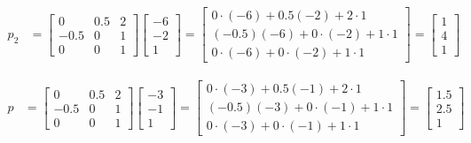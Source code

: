 \documentclass{article}
\begin{document}
\begin{align*}
	p_2 & = \begin{bmatrix}0&0.5&2\\ -0.5&0&1\\ 0&0&1\end{bmatrix} \begin{bmatrix}-6\\ -2\\ 1\end{bmatrix} = \begin{bmatrix}0\cdot \left(-6\right)+0.5\left(-2\right)+2\cdot 1\\ \left(-0.5\right)\left(-6\right)+0\cdot \left(-2\right)+1\cdot 1\\ 0\cdot \left(-6\right)+0\cdot \left(-2\right)+1\cdot 1\end{bmatrix} = \begin{bmatrix}1\\ 4\\ 1\end{bmatrix}
\end{align*}

\begin{align*}
	p & = \begin{bmatrix}0&0.5&2\\ -0.5&0&1\\ 0&0&1\end{bmatrix} \begin{bmatrix}-3\\ -1\\ 1\end{bmatrix} = \begin{bmatrix}0\cdot \left(-3\right)+0.5\left(-1\right)+2\cdot 1\\ \left(-0.5\right)\left(-3\right)+0\cdot \left(-1\right)+1\cdot 1\\ 0\cdot \left(-3\right)+0\cdot \left(-1\right)+1\cdot 1\end{bmatrix} = \begin{bmatrix}1.5\\ 2.5\\ 1\end{bmatrix}
\end{align*}
\end{document}
